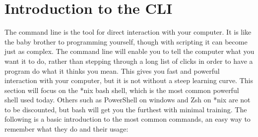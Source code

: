 	\section{Introduction to the CLI}
		The command line is the tool for direct interaction with your computer.
		It is like the baby brother to programming yourself, though with scripting it can become just as complex.
		The command line will enable you to tell the computer what you want it to do, rather than stepping through a long list of clicks in order to have a program do what it thinks you mean.
		This gives you fast and powerful interaction with your computer, but it is not without a steep learning curve.
		This section will focus on the \**nix bash shell, which is the most common powerful shell used today.
		Others such as PowerShell on windows and Zsh on \**nix are not to be discounted, but bash will get you the furthest with minimal training.\cite{CLICrashCourse}
		The following is a basic introduction to the most common commands, an easy way to remember what they do and their usage:
